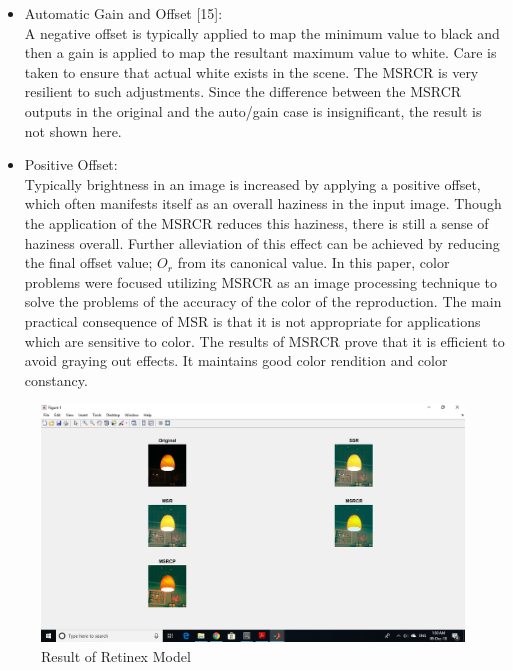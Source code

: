 \begin{itemize}
	\item Automatic Gain and Offset [15]:\\
	A negative offset is typically applied to map the
minimum value to black and then a gain is applied to
map the resultant maximum value to white. Care is taken
to ensure that actual white exists in the scene. The
MSRCR is very resilient to such adjustments. Since the
difference between the MSRCR outputs in the original
and the auto/gain case is insignificant, the result is not
shown here.

\end{itemize}

\begin{itemize}
	\item Positive Offset:\\
	Typically brightness in an image is increased by applying
a positive offset, which often manifests itself as an
overall haziness in the input image. Though the
application of the MSRCR reduces this haziness, there is
still a sense of haziness overall. Further alleviation of this
effect can be achieved by reducing the final offset value;
$O_{r}$ from its canonical value.
In this paper, color problems were focused utilizing
MSRCR as an image processing technique to solve the
problems of the accuracy of the color of the reproduction.
The main practical consequence of MSR is that it is not
appropriate for applications which are sensitive to color.
The results of MSRCR prove that it is efficient to avoid
graying out effects. It maintains good color rendition and
color constancy.
\end{itemize}

\begin{figure}
	\includegraphics[scale=0.5]{images/ch3/retinexModel.jpg}
	\caption{Result of Retinex Model}
\end{figure}

